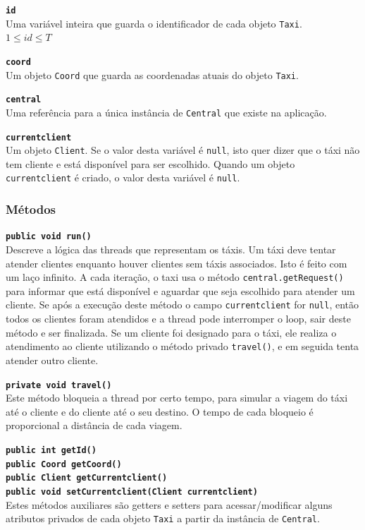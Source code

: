 \documentclass[a4paper,landscape,12pt]{article}
\begin{document}
\textbf{\texttt{id}} \\
Uma variável inteira que guarda o identificador de cada objeto \texttt{Taxi}. \\
$ 1 \leq id \leq T $

\textbf{\texttt{coord}} \\
Um objeto \texttt{Coord} que guarda as coordenadas atuais do objeto \texttt{Taxi}.

\textbf{\texttt{central}} \\
Uma referência para a única instância de \texttt{Central} que existe na aplicação.

\textbf{\texttt{currentclient}} \\
Um objeto \texttt{Client}. Se o valor desta variável é \texttt{null}, isto quer dizer que o táxi não tem cliente e está disponível para ser escolhido. Quando um objeto \texttt{current\-client} é criado, o valor desta variável é \texttt{null}.

\subsubsection{Métodos}

\textbf{\texttt{public void run()}} \\
Descreve a lógica das threads que representam os táxis. Um táxi deve tentar atender clientes enquanto houver clientes sem táxis associados. Isto é feito com um laço infinito. A cada iteração, o taxi usa o método \texttt{central.getRequest()} para informar que está disponível e aguardar que seja escolhido para atender um cliente. Se após a execução deste método o campo \texttt{currentclient} for \texttt{null}, então todos os clientes foram atendidos e a thread pode interromper o loop, sair deste método e ser finalizada. Se um cliente foi designado para o táxi, ele realiza o atendimento ao cliente utilizando o método privado \texttt{travel()}, e em seguida tenta atender outro cliente.

\textbf{\texttt{private void travel()}} \\
Este método bloqueia a thread por certo tempo, para simular a viagem do táxi até o cliente e do cliente até o seu destino. O tempo de cada bloqueio é proporcional a distância de cada viagem.

\textbf{\texttt{public int getId() \\
public Coord getCoord() \\
public Client getCurrentclient() \\
public void setCurrentclient(Client currentclient)}} \\
Estes métodos auxiliares são getters e setters para acessar/modificar alguns atributos privados de cada objeto \texttt{Taxi} a partir da instância de \texttt{Central}.
\end{document}
